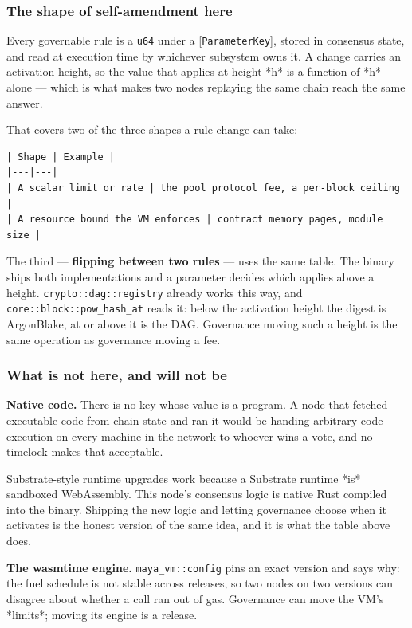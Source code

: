 \documentclass[11pt,a4paper]{article}
\begin{document}
\subsubsection{The shape of self-amendment here}

Every governable rule is a \texttt{u64} under a [\texttt{ParameterKey}], stored in
consensus state, and read at execution time by whichever subsystem owns it.
A change carries an activation height, so the value that applies at height
*h* is a function of *h* alone — which is what makes two nodes replaying the
same chain reach the same answer.

That covers two of the three shapes a rule change can take:

\begin{verbatim}
| Shape | Example |
|---|---|
| A scalar limit or rate | the pool protocol fee, a per-block ceiling |
| A resource bound the VM enforces | contract memory pages, module size |
\end{verbatim}

The third — \textbf{flipping between two rules} — uses the same table. The binary
ships both implementations and a parameter decides which applies above a
height. \texttt{crypto::dag::registry} already works this way, and
\texttt{core::block::pow\_hash\_at} reads it: below the activation height the digest
is ArgonBlake, at or above it is the DAG. Governance moving such a height is
the same operation as governance moving a fee.

\subsubsection{What is not here, and will not be}

\textbf{Native code.} There is no key whose value is a program. A node that
fetched executable code from chain state and ran it would be handing
arbitrary code execution on every machine in the network to whoever wins a
vote, and no timelock makes that acceptable.

Substrate-style runtime upgrades work because a Substrate runtime *is*
sandboxed WebAssembly. This node's consensus logic is native Rust compiled
into the binary. Shipping the new logic and letting governance choose when it
activates is the honest version of the same idea, and it is what the table
above does.

\textbf{The wasmtime engine.} \texttt{maya\_vm::config} pins an exact version and says
why: the fuel schedule is not stable across releases, so two nodes on two
versions can disagree about whether a call ran out of gas. Governance can
move the VM's *limits*; moving its engine is a release.
\end{document}
